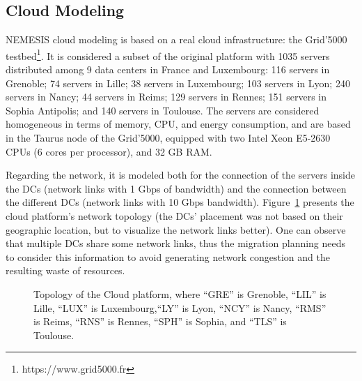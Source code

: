 \subsection{Cloud Modeling}\label{sec:cloud_model}

NEMESIS cloud modeling is based on a real cloud infrastructure: the Grid'5000 testbed\footnote{https://www.grid5000.fr}. It is considered a subset of the original platform with 1035 servers distributed among 9 data centers in France and Luxembourg: 116 servers in Grenoble; 74 servers in Lille; 38 servers in Luxembourg; 103 servers in Lyon; 240 servers in Nancy; 44 servers in Reims;  129 servers in Rennes;  151 servers in Sophia Antipolis; and 140 servers in Toulouse. The servers are considered homogeneous in terms of memory, CPU, and energy consumption, and are based in the Taurus node of the Grid'5000, equipped with two Intel Xeon E5-2630 CPUs (6 cores per processor), and 32 GB RAM.

Regarding the network, it is modeled both for the connection of the servers inside the DCs (network links with 1 Gbps of bandwidth) and the connection between the different DCs  (network links with 10 Gbps bandwidth). Figure~\ref{fig:topology} presents the cloud platform's network topology (the DCs' placement was not based on their geographic location, but to visualize the network links better). One can observe that multiple DCs share some network links, thus the migration planning needs to consider this information to avoid generating network congestion and the resulting waste of resources.

\begin{figure}[ht]
  \centering
   {}
  \caption{Topology of the Cloud platform, where ``GRE'' is Grenoble,  ``LIL'' is Lille, ``LUX'' is Luxembourg,``LY'' is Lyon, ``NCY'' is Nancy, ``RMS'' is Reims,  ``RNS'' is Rennes, ``SPH'' is Sophia, and  ``TLS'' is Toulouse.}
  \label{fig:topology}
 \end{figure}
 


